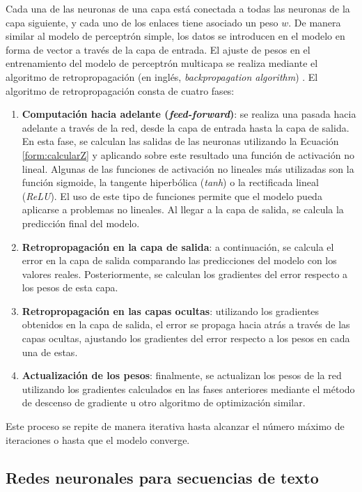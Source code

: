 \documentclass[11pt,spanish,listoffigures,listoftables]{tfgetsinf}
\begin{document}
Cada una de las neuronas de una capa está conectada a todas las neuronas de la capa siguiente, y cada uno de los enlaces tiene asociado un peso $w$. De manera similar al modelo de perceptrón simple, los datos se introducen en el modelo en forma de vector a través de la capa de entrada. El ajuste de pesos en el entrenamiento del modelo de perceptrón multicapa se realiza mediante el algoritmo de retropropagación (en inglés, \textit{backpropagation algorithm}) \cite{Rojas1996}. El algoritmo de retropropagación consta de cuatro fases:

\begin{enumerate}
	\item \textbf{Computación hacia adelante (\textit{feed-forward})}: se realiza una pasada hacia adelante a través de la red, desde la capa de entrada hasta la capa de salida. En esta fase, se calculan las salidas de las neuronas utilizando la Ecuación \ref{form:calcularZ} y aplicando sobre este resultado una función de activación no lineal. Algunas de las funciones de activación no lineales más utilizadas son la función sigmoide, la tangente hiperbólica (\textit{tanh}) o la rectificada lineal (\textit{ReLU}). El uso de este tipo de funciones permite que el modelo pueda aplicarse a problemas no lineales. Al llegar a la capa de salida, se calcula la predicción final del modelo.
	\item \textbf{Retropropagación en la capa de salida}: a continuación, se calcula el error en la capa de salida comparando las predicciones del modelo con los valores reales. Posteriormente, se calculan los gradientes del error respecto a los pesos de esta capa.
	\item \textbf{Retropropagación en las capas ocultas}: utilizando los gradientes obtenidos en la capa de salida, el error se propaga hacia atrás a través de las capas ocultas, ajustando los gradientes del error respecto a los pesos en cada una de estas.
	\item \textbf{Actualización de los pesos}: finalmente, se actualizan los pesos de la red utilizando los gradientes calculados en las fases anteriores mediante el método de descenso de gradiente u otro algoritmo de optimización similar.
\end{enumerate}

Este proceso se repite de manera iterativa hasta alcanzar el número máximo de iteraciones o hasta que el modelo converge.

\subsection{Redes neuronales para secuencias de texto}
\end{document}
